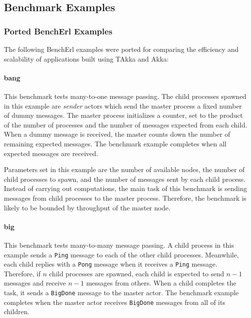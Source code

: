 \subsection{Benchmark Examples}

\subsubsection{Ported BenchErl Examples}
\label{ported_examples}

The following BenchErl examples were ported for comparing the efficiency 
and scalability of applications built using TAkka and Akka:

\paragraph{bang}  This benchmark tests many-to-one message passing.  The child 
processes spawned in this example are {\it sender} actors which send the 
master process a fixed number of dummy messages.  The master process 
initializes a counter, set to the product of the number of processes and the 
number of messages expected from each child.  When a dummy message is received, 
the master counts down the number of remaining expected messages.  The 
benchmark example completes when all expected messages are received.  

Parameters set in this example are the number of available nodes, the 
number of child processes to spawn, and the number of messages sent by each 
child process.  Instead of carrying out computations, the main task of this 
benchmark is sending messages from child processes to the master process.  
Therefore, the benchmark is likely to be bounded by throughput of the master node.


\paragraph{big}  This benchmark tests many-to-many message passing.  A child 
process in this example sends a {\tt Ping} message to each of the other child 
processes.  Meanwhile, each child replies with a {\tt Pong} message when it 
receives a {\tt Ping} message.  Therefore, if $n$ child processes are spawned, 
each child is expected to send $n-1$ messages and receive $n-1$ messages from 
others.  When a child completes the task, it sends a {\tt BigDone} message to 
the master actor.  The benchmark example completes when the master actor 
receives {\tt BigDone} messages from all of its children.  

